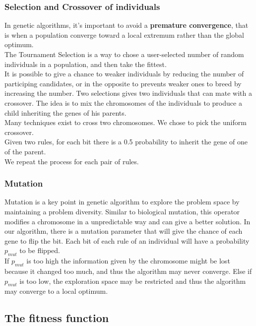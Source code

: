 \documentclass[a4paper,12pt]{article}
\begin{document}
\subsubsection{Selection and Crossover of individuals}

In genetic algorithms, it's important to avoid a \textbf{premature convergence}, that is when a population converge toward a local extremum rather than the global optimum. \\
The Tournament Selection is a way to chose a user-selected number of random individuals in a population, and then take the fittest.\\
It is possible to give a chance to weaker individuals by reducing the number of participing candidates, or in the opposite to prevents weaker ones to breed by increasing the number.
Two selections gives two individuals that can mate with a crossover.
The idea is to mix the chromosomes of the individuals to produce a child inheriting the genes of his parents.\\
Many techniques exist to cross two chromosomes. We chose to pick the uniform crossover.\\
Given two rules, for each bit there is a 0.5 probability to inherit the gene of one of the parent.\\
We repeat the process for each pair of rules.

\subsubsection{Mutation}

Mutation is a key point in genetic algorithm to explore the problem space by maintaining a problem diversity. Similar to biological mutation, this operator modifies a chromosome in a unpredictable way and can give a better solution.
In our algorithm, there is a mutation parameter that will give the chance of each gene to flip the bit. Each bit of each rule of an individual will have a probability $p_{mut}$ to be flipped.\\
If $p_{mut}$ is too high the information given by the chromosome might be lost because it changed too much, and thus the algorithm may never converge. Else if $p_{mut}$ is too low, the exploration space may be restricted and thus the algorithm may converge to a local optimum.


\subsection{The fitness function}
\end{document}
